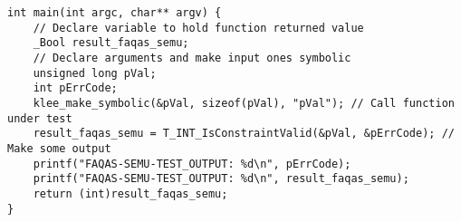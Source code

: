 
\begin{lstlisting}[float=t, style=CStyle, caption=SEMuS test template., label=test_template]
int main(int argc, char** argv) {
    // Declare variable to hold function returned value
    _Bool result_faqas_semu; 
    // Declare arguments and make input ones symbolic
    unsigned long pVal;
    int pErrCode;
    klee_make_symbolic(&pVal, sizeof(pVal), "pVal"); // Call function under test
    result_faqas_semu = T_INT_IsConstraintValid(&pVal, &pErrCode); // Make some output
    printf("FAQAS-SEMU-TEST_OUTPUT: %d\n", pErrCode);
    printf("FAQAS-SEMU-TEST_OUTPUT: %d\n", result_faqas_semu);
    return (int)result_faqas_semu;
}

\end{lstlisting}